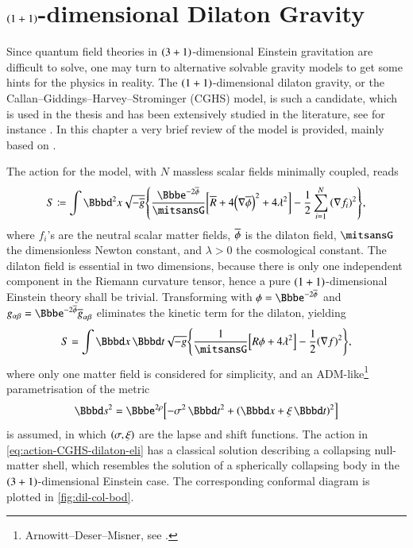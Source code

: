 \chapter{${\left(1+1\right)}$-dimensional Dilaton Gravity}
\label{sec:1+1ddlt}

Since quantum field theories in ${\left(3+1\right)}$-dimensional Einstein gravitation 
are difficult to solve, one may turn to alternative solvable gravity models to 
get some hints for the physics in reality. The ${\left(1+1\right)}$-dimensional dilaton 
gravity, or the Callan--Giddings--Harvey--Strominger (CGHS) model, is such a 
candidate, which is used in the thesis and has been extensively studied in the 
literature, see for instance \cite{Callan1992,Demers1996,Ashtekar2011}. In this 
chapter a very brief review of the model is provided, mainly based on 
\cite{Demers1996}.

The action for the model, with $N$ massless scalar fields minimally coupled, 
reads
\begin{equation}
S \coloneqq \int \dd^2 x \sqrt{-\ol{g}}\cbr{\frac{\ee^{-2\ol{\phi}}}{\nG}
\sbr{\ol{R}+4\rbr{\nabla \ol{\phi}}^2 + 4\lambda^2}
-\frac{1}{2}\sum_{i=1}^N\rbr{\nabla f_i}^2},
\label{eq:action-CGHS-dilaton}
\end{equation}
where $f_i$'s are the neutral scalar matter fields, ${\overline{{\phi}}}$ is the dilaton 
field, $\nG$ the dimensionless Newton constant, and $\lambda > 0$ the 
cosmological constant. The dilaton field is essential in two dimensions, because 
there is only one independent component in the Riemann curvature tensor, hence a 
pure ${\left(1+1\right)}$-dimensional Einstein theory shall be trivial. Transforming 
with $\phi = \ee^{-2\ol{\phi}}$ and $g_{\alpha\beta} = \ee^{-2\ol{\phi}} 
\ol{g}_{\alpha\beta}$ eliminates the kinetic term for the dilaton, yielding
\begin{equation}
S = \int \dd x\,\dd t\sqrt{-g}\cbr{\frac{1}{\nG}\sbr{R\phi + 4\lambda^2}
-\frac{1}{2}\rbr{\nabla f}^2},
\label{eq:action-CGHS-dilaton-eli}
\end{equation}
where only one matter field is considered for simplicity, and an 
ADM-like\footnote{Arnowitt--Deser--Misner, see \cite{Arnowitt2008}.}
parametrisation of the metric
\begin{equation}
\dd s^2 = \ee^{2\rho}\sbr{-\sigma^2\,\dd t^2 + \rbr{\dd x + \xi\,\dd t}^2}
\label{eq:ADM-para}
\end{equation}
is assumed, in which ${\left(\sigma, \xi\right)}$ are the lapse and shift functions.
The action in \cref{eq:action-CGHS-dilaton-eli} has a classical solution 
describing a collapsing null-matter shell, which resembles the solution of 
a spherically collapsing body in the ${\left(3+1\right)}$-dimensional Einstein case. 
The corresponding conformal diagram is plotted in \cref{fig:dil-col-bod}.


